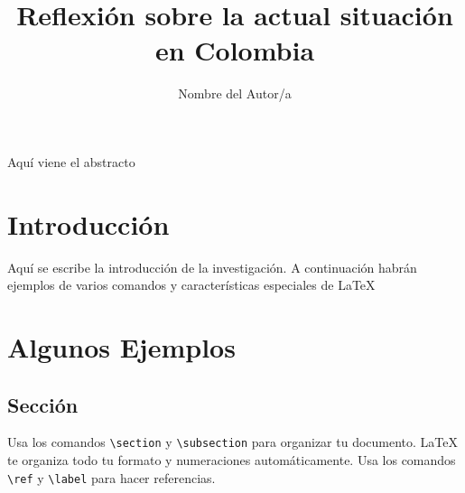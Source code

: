 \documentclass[doc, 12pt, letterpaper, donotrepeattitle, floatsintext, apacite]{apa6}    %
\title{\Large Reflexión sobre la actual situación en Colombia}
\author{Nombre del Autor/a}
\affiliation{Universidad de los Andes\\ Materia en Curso\\ Código: 123456789}
\newcommand{\latex}{\LaTeX\xspace}  %
\begin{document}
\vspace*{-2cm}      %
\maketitle          %


\doublespacing %

Aquí viene el abstracto \cite{lamport1986}



\section{\large Introducción}
Aquí se escribe la introducción de la investigación. A continuación habrán ejemplos de varios comandos y características especiales de \latex

\section{\large Algunos Ejemplos}

\subsection{Sección}
Usa los comandos \verb|\section| y \verb|\subsection| para organizar tu documento. \latex te organiza todo tu formato y numeraciones automáticamente. Usa los comandos \verb|\ref| y \verb|\label| para hacer referencias.
\end{document}

